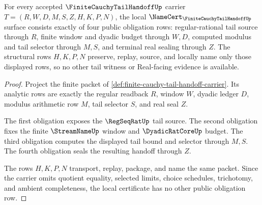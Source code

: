 \begin{theorem}
\label{thm:finite-cauchy-tail-handoff-namecert-obligations}
For every accepted $\FiniteCauchyTailHandoffUp$ carrier $T=(R,W,D,M,S,Z,H,K,P,N)$, the local $\NameCert_{\FiniteCauchyTailHandoffUp}$ surface consists exactly of four public obligation rows: regular-rational tail source through $R$, finite window and dyadic budget through $W,D$, computed modulus and tail selector through $M,S$, and terminal real sealing through $Z$. The structural rows $H,K,P,N$ preserve, replay, source, and locally name only those displayed rows, so no other tail witness or Real-facing evidence is available.
\end{theorem}
\begin{proof}
Project the finite packet of \autoref{def:finite-cauchy-tail-handoff-carrier}. Its analytic rows are exactly the regular readback $R$, window $W$, dyadic ledger $D$, modulus arithmetic row $M$, tail selector $S$, and real seal $Z$.

The first obligation exposes the $\RegSeqRatUp$ tail source. The second obligation fixes the finite $\StreamNameUp$ window and $\DyadicRatCoreUp$ budget. The third obligation computes the displayed tail bound and selector through $M,S$. The fourth obligation seals the resulting handoff through $Z$.

The rows $H,K,P,N$ transport, replay, package, and name the same packet. Since the carrier omits quotient equality, selected limits, choice schedules, trichotomy, and ambient completeness, the local certificate has no other public obligation row.
\end{proof}

